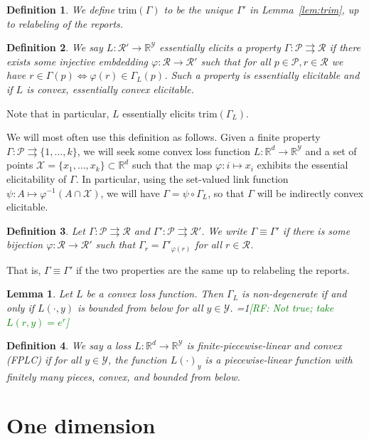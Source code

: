 \documentclass[11pt]{article}
\newcommand{\Comments}{1}
\newcommand{\mynote}[2]{\ifnum\Comments=1\textcolor{#1}{#2}\fi}
\newcommand{\raf}[1]{\mynote{green}{[RF: #1]}}
\newcommand{\reals}{\mathbb{R}}
\renewcommand{\P}{\mathcal{P}}
\newcommand{\R}{\mathcal{R}}
\newcommand{\X}{\mathcal{X}}
\newcommand{\Y}{\mathcal{Y}}
\newcommand{\toto}{\rightrightarrows}
\newcommand{\trim}{\mathrm{trim}}
\newtheorem{lemma}{Lemma}
\newtheorem{definition}{Definition}
\begin{document}
\begin{definition}\label{def:trim}
  We define $\trim(\Gamma)$ to be the unique $\Gamma'$ in Lemma~\ref{lem:trim}, up to relabeling of the reports.
\end{definition}

\begin{definition}
  We say $L:\R'\to\reals^\Y$ \emph{essentially elicits} a property $\Gamma : \P \toto \R$ if there exists some injective embdedding $\varphi:\R\to\R'$ such that for all $p\in\P,r\in\R$ we have $r \in \Gamma(p) \iff \varphi(r) \in \Gamma_L(p)$.
  Such a property is \emph{essentially elicitable} and if $L$ is convex, \emph{essentially convex elicitable}.
\end{definition}
Note that in particular, $L$ essentially elicits $\trim(\Gamma_L)$.

We will most often use this definition as follows.
Given a finite property $\Gamma : \P \toto \{1,\ldots,k\}$, we will seek some convex loss function $L : \reals^d \to \reals^\Y$ and a set of points $\X=\{x_1,\ldots,x_k\} \subset \reals^d$ such that the map $\varphi:i\mapsto x_i$ exhibits the essential elicitability of $\Gamma$.
In particular, using the set-valued link function $\psi:A\mapsto \varphi^{-1}(A\cap\X)$, we will have $\Gamma = \psi \circ \Gamma_L$, so that $\Gamma$ will be indirectly convex elicitable.

\begin{definition}
  Let $\Gamma:\P\toto\R$ and $\Gamma':\P\toto\R'$.
  We write $\Gamma \equiv \Gamma'$ if there is some bijection $\varphi:\R\to\R'$ such that $\Gamma_r = \Gamma'_{\varphi(r)}$ for all $r\in\R$.
\end{definition}
That is, $\Gamma\equiv\Gamma'$ if the two properties are the same up to relabeling the reports.

\begin{lemma}
  Let $L$ be a convex loss function.
  Then $\Gamma_L$ is non-degenerate if and only if $L(\cdot,y)$ is bounded from below for all $y\in\Y$.
  \raf{Not true; take $L(r,y) = e^r$}
\end{lemma}

\begin{definition}
  We say a loss $L:\reals^d \to \reals^\Y$ is \emph{finite-piecewise-linear and convex (FPLC)} if for all $y\in\Y$, the function $L(\cdot)_y$ is a piecewise-linear function with finitely many pieces, convex, and bounded from below.
\end{definition}

\section{One dimension}
\end{document}
